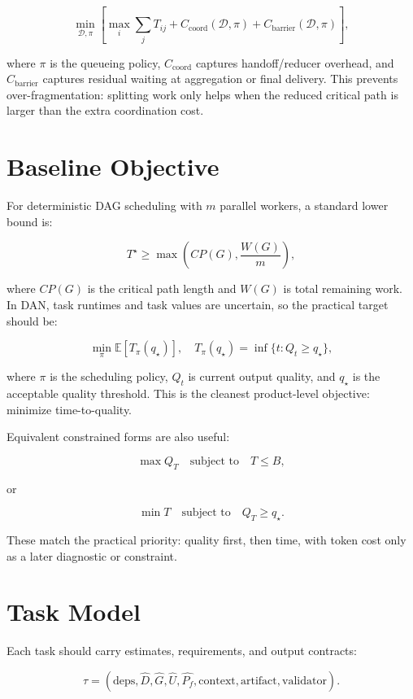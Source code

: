\documentclass[11pt]{article}
\newcommand{\E}{\mathbb{E}}
\begin{document}
\[
\min_{\mathcal{D}, \pi}
\left[
\max_i \sum_j T_{ij}
+ C_{\text{coord}}(\mathcal{D}, \pi)
+ C_{\text{barrier}}(\mathcal{D}, \pi)
\right],
\]

where $\pi$ is the queueing policy, $C_{\text{coord}}$ captures handoff/reducer overhead, and $C_{\text{barrier}}$ captures residual waiting at aggregation or final delivery. This prevents over-fragmentation: splitting work only helps when the reduced critical path is larger than the extra coordination cost.

\section{Baseline Objective}

For deterministic DAG scheduling with $m$ parallel workers, a standard lower bound is:

\[
T^\star \geq \max \left( CP(G), \frac{W(G)}{m} \right),
\]

where $CP(G)$ is the critical path length and $W(G)$ is total remaining work. In DAN, task runtimes and task values are uncertain, so the practical target should be:

\[
\min_\pi \E \left[ T_\pi(q_\star) \right],
\quad
T_\pi(q_\star) = \inf \{t : Q_t \geq q_\star\},
\]

where $\pi$ is the scheduling policy, $Q_t$ is current output quality, and $q_\star$ is the acceptable quality threshold. This is the cleanest product-level objective: minimize time-to-quality.

Equivalent constrained forms are also useful:

\[
\max Q_T \quad \text{subject to} \quad T \leq B,
\]

or

\[
\min T \quad \text{subject to} \quad Q_T \geq q_\star.
\]

These match the practical priority: quality first, then time, with token cost only as a later diagnostic or constraint.

\section{Task Model}

Each task should carry estimates, requirements, and output contracts:

\[
\tau =
(\text{deps}, \widehat{D}, \widehat{G}, \widehat{U}, \widehat{P_f},
\text{context}, \text{artifact}, \text{validator}).
\]
\end{document}
